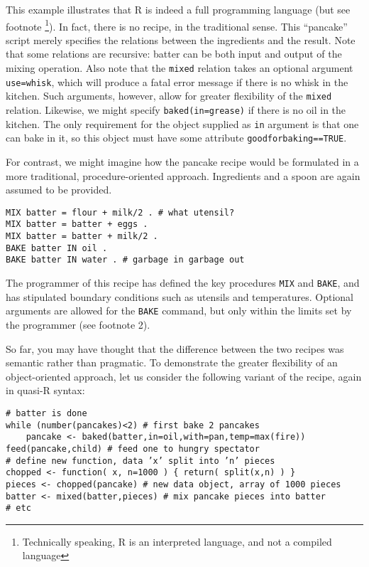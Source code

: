 \documentclass[]{book}
\begin{document}
This example illustrates that R is indeed a full
programming language (but see footnote \footnote{Technically speaking, R is an interpreted language, and not a compiled language}).
In fact, there is no recipe, in the
traditional sense. This ``pancake'' script merely specifies the relations
between the ingredients and the result. Note that some relations are
recursive: batter can be both input and output of the mixing operation.
Also note that the \texttt{mixed} relation takes an
optional argument \texttt{use=whisk}, which will produce
a fatal error message if there is no whisk in the kitchen. Such
arguments, however, allow for greater flexibility of the
\texttt{mixed} relation. Likewise, we might specify
\texttt{baked(in=grease)} if there is no oil in the
kitchen. The only requirement for the object supplied as
\texttt{in} argument is that one can bake in it, so this
object must have some attribute
\texttt{goodforbaking==TRUE}.

For contrast, we might imagine how the pancake recipe would be
formulated in a more traditional, procedure-oriented approach.
Ingredients and a spoon are again assumed to be provided.

\begin{verbatim}
MIX batter = flour + milk/2 . # what utensil? 
MIX batter = batter + eggs . 
MIX batter = batter + milk/2 .
BAKE batter IN oil .
BAKE batter IN water . # garbage in garbage out
\end{verbatim}

The programmer of this recipe has defined the key procedures \texttt{MIX} and
\texttt{BAKE}, and has stipulated boundary conditions such as utensils and
temperatures. Optional arguments are allowed for the \texttt{BAKE} command, but
only within the limits set by the programmer (see footnote 2).

So far, you may have thought that the difference between the two recipes
was semantic rather than pragmatic. To demonstrate the greater
flexibility of an object-oriented approach, let us consider the
following variant of the recipe, again in quasi-R syntax:

\begin{verbatim}
# batter is done
while (number(pancakes)<2) # first bake 2 pancakes
    pancake <- baked(batter,in=oil,with=pan,temp=max(fire))
feed(pancake,child) # feed one to hungry spectator
# define new function, data ’x’ split into ’n’ pieces
chopped <- function( x, n=1000 ) { return( split(x,n) ) } 
pieces <- chopped(pancake) # new data object, array of 1000 pieces
batter <- mixed(batter,pieces) # mix pancake pieces into batter
# etc
\end{verbatim}
\end{document}
